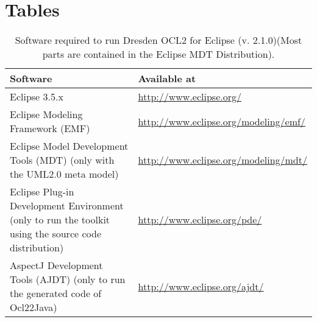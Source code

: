 \cleardoublepage
{}
{}
\chapter*{Tables}

\begin{table}[h]
\begin{tabular}{|p{7cm}|p{7cm}|}
    \hline
    \textbf{Software} & \textbf{Available at} \\
    \hline
    Eclipse 3.5.x & \url{http://www.eclipse.org/} \\
    \hline
    Eclipse Modeling Framework (EMF) & \url{http://www.eclipse.org/modeling/emf/} \\
    \hline
    Eclipse Model Development Tools (MDT) (only with the UML2.0 meta model) & \url{http://www.eclipse.org/modeling/mdt/} \\
    \hline
    Eclipse Plug-in Development Environment (only to run the toolkit using the source code distribution) & \url{http://www.eclipse.org/pde/} \\
    \hline
    AspectJ Development Tools (AJDT) (only to run the generated code of Ocl22Java) & \url{http://www.eclipse.org/ajdt/} \\
    \hline
\end{tabular}
\caption{Software required to run Dresden OCL2 for Eclipse (v. 2.1.0)\newline(Most parts are con\-tained in the Eclipse MDT Distribution).}
\label{tab:software}
\end{table}



